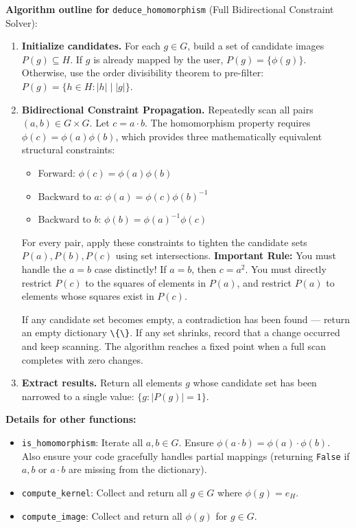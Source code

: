 \documentclass[11pt]{article}
\begin{document}
\textbf{Algorithm outline for} \lstinline|deduce_homomorphism| (Full Bidirectional Constraint Solver):
\begin{enumerate}
    \item \textbf{Initialize candidates.} For each $g \in G$, build a set of candidate images $P(g) \subseteq H$. If $g$ is already mapped by the user, $P(g) = \{\phi(g)\}$. Otherwise, use the order divisibility theorem to pre-filter: $P(g) = \{h \in H : |h| \mid |g| \}$.
    \item \textbf{Bidirectional Constraint Propagation.} Repeatedly scan all pairs $(a, b) \in G \times G$. Let $c = a \cdot b$. The homomorphism property requires $\phi(c) = \phi(a)\phi(b)$, which provides three mathematically equivalent structural constraints:
    \begin{itemize}
        \item Forward: $\phi(c) = \phi(a)\phi(b)$
        \item Backward to $a$: $\phi(a) = \phi(c)\phi(b)^{-1}$
        \item Backward to $b$: $\phi(b) = \phi(a)^{-1}\phi(c)$
    \end{itemize}
    For every pair, apply these constraints to tighten the candidate sets $P(a), P(b), P(c)$ using set intersections. \textbf{Important Rule:} You must handle the $a = b$ case distinctly! If $a = b$, then $c = a^2$. You must directly restrict $P(c)$ to the squares of elements in $P(a)$, and restrict $P(a)$ to elements whose squares exist in $P(c)$.
    
    If any candidate set becomes empty, a contradiction has been found --- return an empty dictionary \lstinline|\{\}|. If any set shrinks, record that a change occurred and keep scanning. The algorithm reaches a fixed point when a full scan completes with zero changes.
    \item \textbf{Extract results.} Return all elements $g$ whose candidate set has been narrowed to a single value: $\{g : |P(g)| = 1\}$.
\end{enumerate}

\textbf{Details for other functions:}
\begin{itemize}
    \item \lstinline|is_homomorphism|: Iterate all $a, b \in G$. Ensure $\phi(a \cdot b) = \phi(a) \cdot \phi(b)$. Also ensure your code gracefully handles partial mappings (returning \lstinline|False| if $a, b$ or $a \cdot b$ are missing from the dictionary).
    \item \lstinline|compute_kernel|: Collect and return all $g \in G$ where $\phi(g) = e_H$.
    \item \lstinline|compute_image|: Collect and return all $\phi(g)$ for $g \in G$.
\end{itemize}
\end{document}
